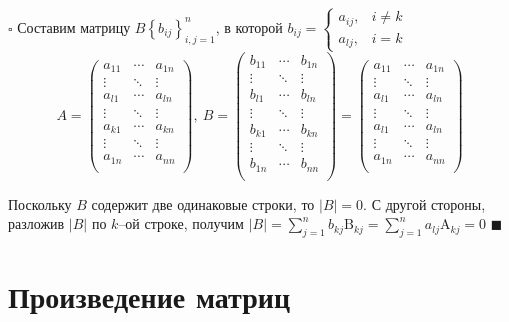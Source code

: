 \documentclass[12pt, a4paper]{report}
\begin{document}
	\(\square\) Составим матрицу \(B\left\{b_{ij}\right\}_{i,j=1}^{n}\), в которой \(b_{ij}=\begin{cases}a_{ij},&i\neq k\\a_{lj},&i=k\end{cases}\)
	\[A=\begin{pmatrix}a_{11}&\dotsb&a_{1n}\\
						\vdots&\ddots&\vdots\\
						a_{l1}&\dotsb&a_{ln}\\
						\vdots&\ddots&\vdots\\
						a_{k1}&\dotsb&a_{kn}\\
						\vdots&\ddots&\vdots\\
						a_{1n}&\dotsb&a_{nn}\\\end{pmatrix},~ B=\begin{pmatrix}
																			b_{11}&\dotsb&b_{1n}\\
																			\vdots&\ddots&\vdots\\
																			b_{l1}&\dotsb&b_{ln}\\
																			\vdots&\ddots&\vdots\\
																			b_{k1}&\dotsb&b_{kn}\\
																			\vdots&\ddots&\vdots\\
																			b_{1n}&\dotsb&b_{nn}\\
																\end{pmatrix}=\begin{pmatrix}
																				a_{11}&\dotsb&a_{1n}\\
																				\vdots&\ddots&\vdots\\
																				a_{l1}&\dotsb&a_{ln}\\
																				\vdots&\ddots&\vdots\\
																				a_{l1}&\dotsb&a_{ln}\\
																				\vdots&\ddots&\vdots\\
																				a_{1n}&\dotsb&a_{nn}\\
																			\end{pmatrix}\]
																			
	\medskip Поскольку \(B\) содержит две одинаковые строки, то \(|B|=0\). С другой стороны, разложив \(|B|\) по \(k\text{--ой}\) строке, получим \(\displaystyle |B|=\sum_{j=1}^{n}b_{kj}\mathrm{B}_{kj}=\sum_{j=1}^{n}a_{lj}\mathrm{A}_{kj}=0\) \(\blacksquare\)
	\chapter{Произведение матриц}
\end{document}

